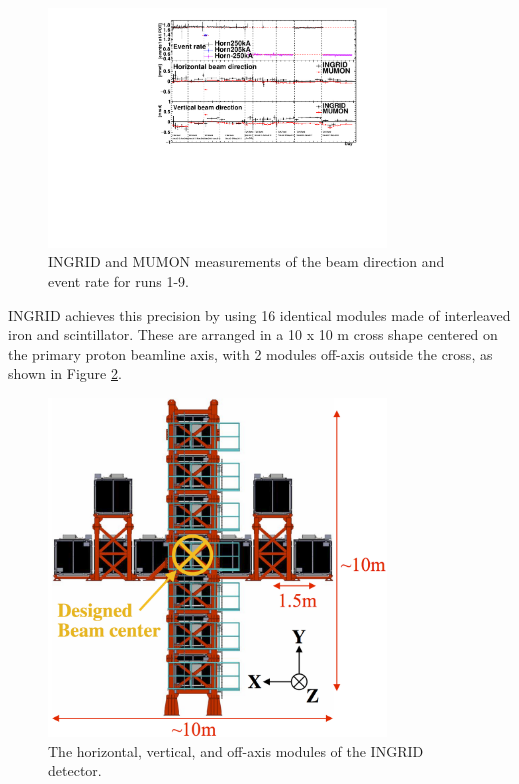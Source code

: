 \begin{figure}
\centering
\includegraphics*[width=0.8\textwidth,clip]{figs/mumoningrid}
\caption{INGRID and MUMON measurements of the beam direction and event rate for runs 1-9.} \label{mumoningrid}
\end{figure}

INGRID achieves this precision by using 16 identical modules made of interleaved iron and scintillator. These are arranged in a 10 x 10 m cross shape centered on the primary proton beamline axis, with 2 modules off-axis outside the cross, as shown in Figure \ref{ingridcross}. 

\begin{figure}
\centering
\includegraphics*[width=0.8\textwidth,clip]{figs/ingridcross}
\caption{The horizontal, vertical, and off-axis modules of the INGRID detector.} \label{ingridcross}
\end{figure}

